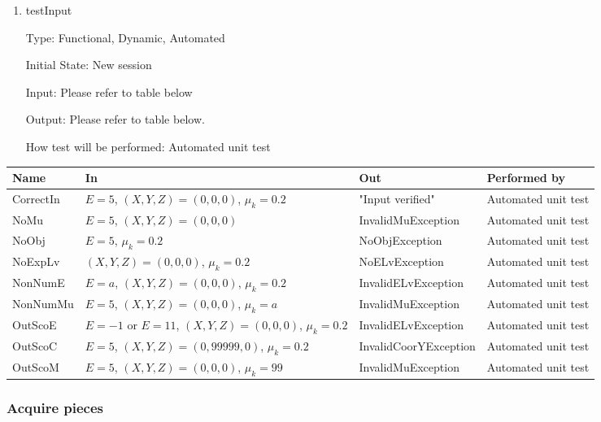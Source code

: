 \documentclass[12pt, titlepage]{article}
\begin{document}
	\begin{enumerate}
		
		\item{testInput}
		
		Type: Functional, Dynamic, Automated
		
		Initial State: New session
		
		Input: Please refer to table below
		
		Output: Please refer to table below.
		
		How test will be performed: Automated unit test
		
	\end{enumerate}
	
	\begin{center}
		\begin{tabular}{p{2cm} p{5cm} p{4cm} p{4cm}}
			\hline
			\textbf{Name} & \textbf{In} & \textbf{Out} & \textbf{Performed by} \\
			\hline
			CorrectIn &$E = 5$, $(X,Y,Z) = (0,0,0)$, $\mu_{k} = 0.2$ &"Input verified"&Automated unit test\\
			NoMu & $E = 5$, $(X,Y,Z) = (0,0,0)$  & InvalidMuException & Automated unit test\\
			NoObj & $E = 5$, $\mu_{k} = 0.2$ & NoObjException & Automated unit test\\
			NoExpLv & $(X,Y,Z) = (0,0,0)$, $\mu_{k} = 0.2$ & NoELvException & Automated unit test\\
			NonNumE & $E = a$, $(X,Y,Z) = (0,0,0)$, $\mu_{k} = 0.2$ & InvalidELvException & Automated unit test\\
			NonNumMu & $E = 5$, $(X,Y,Z) = (0,0,0)$, $\mu_{k} = a$ & InvalidMuException & Automated unit test\\
			OutScoE & $E = -1$ or $E = 11$, $(X,Y,Z) = (0,0,0)$, $\mu_{k} = 0.2$  & InvalidELvException & Automated unit test\\
			OutScoC & $E = 5$, $(X,Y,Z) = (0,99999,0)$, $\mu_{k} = 0.2$ & InvalidCoorYException & Automated unit test\\
			OutScoM & $E = 5$, $(X,Y,Z) = (0,0,0)$, $\mu_{k} = 99$ &InvalidMuException & Automated unit test\\
			\hline		
		\end{tabular}
	\end{center}
	
	\subsubsection{Acquire pieces}
	\label{Sec_testGravityCenter}
	
\end{document}
